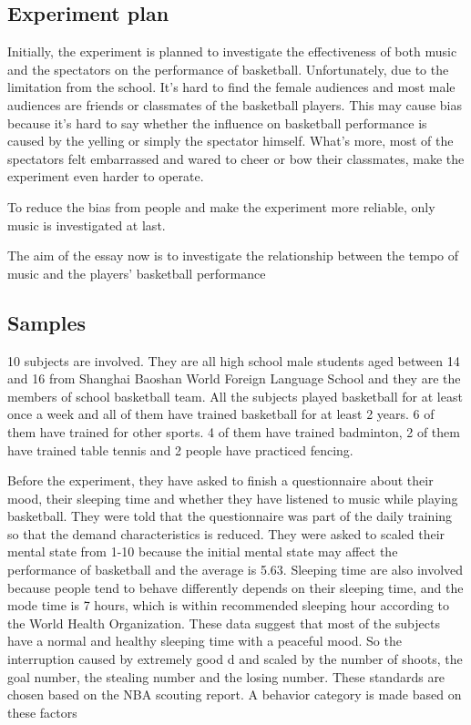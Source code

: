\documentclass[man,floatsintext]{apa7}
\begin{document}
\subsection{Experiment plan}
Initially, the experiment is planned to investigate the effectiveness of both music and the spectators on the performance of basketball. Unfortunately, due to the limitation from the school. It's hard to find the female audiences and most male audiences are friends or classmates of the basketball players. This may cause bias because it's hard to say whether the influence on basketball performance is caused by the yelling or simply the spectator himself. What's more, most of the spectators felt embarrassed and wared to cheer or bow their classmates, make the experiment even harder to operate.

To reduce the bias from people and make the experiment more reliable, only music is investigated at last. 

The aim of the essay now is to investigate the relationship between the tempo of music and the players' basketball performance

\subsection{Samples}
10 subjects are involved. They are all high school male students aged between 14 and 16 from Shanghai Baoshan World Foreign Language School and they are the members of school basketball team. All the subjects played basketball for at least once a week and all of them have trained basketball for at least 2 years. 6 of them have trained for other sports. 4 of them have trained badminton, 2 of them have trained table tennis and 2 people have practiced fencing. 

Before the experiment, they have asked to finish a questionnaire about their mood, their sleeping time and whether they have listened to music while playing basketball. They were told that the questionnaire was part of the daily training so that the demand characteristics is reduced. They were asked to scaled their mental state from 1-10 because the initial mental state may affect the performance of basketball \autocite{liuMoodStatusResponse2023} and the average is 5.63. Sleeping time are also involved because people tend to behave differently depends on their sleeping time, and the mode time is 7 hours, which is within recommended sleeping hour according to the World Health Organization. These data suggest that most of the subjects have a normal and healthy sleeping time with a peaceful mood. So the interruption caused by extremely good d and scaled by the number of
shoots, the goal number, the stealing number and the losing number. These
standards are chosen based on the NBA scouting report.\autocite{NBAZhongGuoGuanFangWangZhanQiuYuanZiLiao2024} A behavior category is made based on these factors
\end{document}
